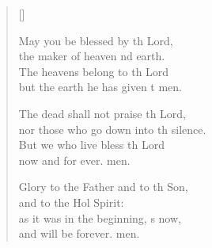 \begin{verse}[\versewidth]
\begin{patverse}
May you be blessed by th Lord,\Med\\
the maker of heaven nd earth.\\
The heavens belong to th Lord\Med\\
but the earth he has given t men.

The dead shall not praise th Lord,\Med\\
nor those who go down into th silence.\\
But we who live bless th Lord\Med\\
now and for ever. men.

Glory to the Father and to th Son,\Med\\
and to the Hol Spirit:\\
as it was in the beginning, \pointup{\i}s now,\Med\\
and will be forever. men. 
  \end{patverse}
\end{verse}
